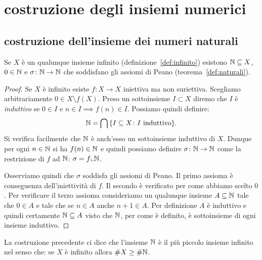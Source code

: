 \section{costruzione degli insiemi numerici}
\label{sec:costruzione}

\subsection{costruzione dell'insieme dei numeri naturali}

\begin{theorem}
  \label{th:esistenza_naturali}%
Se $X$ è un qualunque insieme infinito (definizione~\ref{def:infinito})
esistono ${\mathbb N}\subseteq X$, $0\in {\mathbb N}$ e $\sigma\colon {\mathbb N}\to{\mathbb N}$ 
che soddisfano gli assiomi di Peano (teorema~\ref{def:naturali}).
\end{theorem}
%
\begin{proof}
Se $X$ è infinito esiste $f\colon X\to X$ iniettiva ma non suriettiva. 
Scegliamo arbitrariamente $0\in X\setminus f(X)$. 
Preso un sottoinsieme $I\subset X$ diremo che $I$ è \emph{induttivo}
%
%
se $0\in I$ e $n\in I\implies f(n)\in I$. 
Possiamo quindi definire:
\[
  {\mathbb N} = \bigcap {\left\{ I\subseteq X\colon \text{$I$ induttivo} \right\}}.
\]
Si verifica facilmente che ${\mathbb N}$ è anch'esso un sottoinsieme induttivo di $X$.
Dunque per ogni $n\in {\mathbb N}$ si ha $f(n)\in {\mathbb N}$ e quindi possiamo 
definire $\sigma\colon {\mathbb N}\to {\mathbb N}$ come la restrizione di $f$ 
ad ${\mathbb N}$: $\sigma=f\llcorner {\mathbb N}$.

Osserviamo quindi che $\sigma$ soddisfa gli assiomi di Peano.
Il primo assioma è conseguenza dell'iniettività di $f$.
Il secondo è verificato per come abbiamo scelto $0$.
Per verificare il terzo assioma consideriamo un qualunque insieme 
$A\subseteq {\mathbb N}$ tale che $0\in A$ e tale che se $n\in A$ anche $n+1\in A$.
Per definizione $A$ è induttivo e quindi certamente 
${\mathbb N}\subseteq A$ visto che ${\mathbb N}$, per come è definito,
è sottoinsieme di ogni insieme induttivo.
\end{proof}

La costruzione precedente ci dice che l'insieme ${\mathbb N}$ è il più piccolo insieme infinito
nel senso che: se $X$ è infinito allora $\# X \ge \# {\mathbb N}$. 


